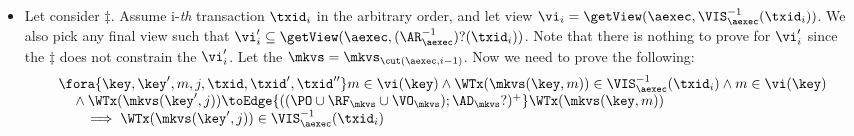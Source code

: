 \begin{itemize}
\item Let consider \( \ddagger \).
Assume i-\emph{th} transaction \( \txid_i \) in the arbitrary order,
and let view \( \vi_{i} = \getView(\aexec, \VIS^{-1}_{\aexec}(\txid_{i}) ) \).
We also pick any final view such that \( \vi'_{i} \subseteq \getView(\aexec, (\AR^{-1}_{\aexec})?(\txid_{i}) ) \).
Note that there is nothing to prove for \( \vi'_i \) since the \( \ddagger \) does not constrain the \( \vi'_i \).
Let the \( \mkvs = \mkvs_{\cut(\aexec, i-1)} \).
Now we need to prove the following:
\begin{gather}
    \label{equ:si-complete-arvis}
    \begin{array}{@{}l@{}}
        \fora{\key, \key', m, j, \txid, \txid', \txid''} 
        m \in \vi(\key) 
        \land \WTx(\mkvs(\key,m)) \in \VIS^{-1}_{\aexec}(\txid_{i})
        \land m \in \vi(\key)  \\
        \quad {} \wedge \WTx(\mkvs(\key', j)) \toEdge{((\PO \cup \RF_{\mkvs} \cup \VO_{\mkvs}) ; \AD_{\mkvs}?)^{+}} \WTx(\mkvs(\key, m)) \\
        \qquad \implies \WTx(\mkvs(\key',j)) \in \VIS^{-1}_{\aexec}(\txid_{i})
    \end{array} 
\end{gather}

\end{itemize}
